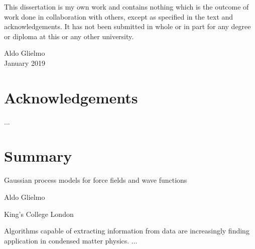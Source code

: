 
\vspace{.2cm}

\noindent This dissertation is my own work and contains nothing which is the outcome of work done in collaboration with others, except as specified in the text and acknowledgements.
%
It has not been submitted in whole or in part for any degree or diploma at this or any other university.

\vspace{1.5cm}

\begin{raggedleft}
Aldo Glielmo \\
January 2019

\end{raggedleft}


%
%

\thispagestyle{empty}
\chapter*{Acknowledgements}
%
...


%
%

\thispagestyle{empty}
\chapter*{Summary}

\begin{center}

{\Large\sffamily Gaussian process models for force fields and wave functions}

\vspace{.2cm}

{\large\sffamily Aldo Glielmo}

\vspace{.03cm}

{\large\sffamily King's College London}
%
\vspace{.2cm}

\end{center}
%
\noindent
%
Algorithms capable of extracting information from data are increasingly finding application in condensed matter physics.
%
...

